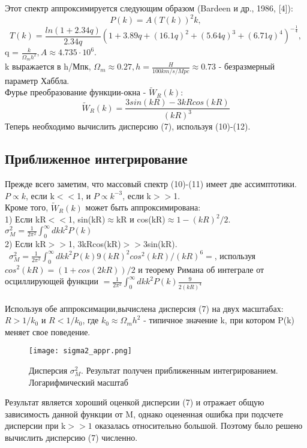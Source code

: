 \documentclass[11pt]{article}
\begin{document}
Этот спектр аппроксимируется следующим образом (Bardeen и др., 1986, [4]): \\
\begin{equation}
P(k) = A(T(k))^2k,
\end{equation}
\begin{equation}
T(k) = \frac{ln(1+2.34q)}{2.34q}(1+3.89q+(16.1q)^2+(5.64q)^3+(6.71q)^4)^{-\frac{1}{4}},
\end{equation}
q = $\frac{k}{\Omega_mh^2}, A\approx4.735\cdot10^6.$ \\
k выражается в h/Мпк, $\Omega_m \approx0.27, h = \frac{H}{100km/s/Mpc}\approx0.73$ - безразмерный параметр Хаббла.\\
Фурье преобразование функции-окна - $ \tilde{W}_R(k)$:
\begin{equation}
\tilde{W}_R(k) = \frac{3sin(kR) - 3kRcos(kR)}{(kR)^3}
\end{equation}
Теперь необходимо вычислить дисперсию (7), используя (10)-(12).  
\subsection{Приближенное интегрирование}
Прежде всего заметим, что массовый спектр (10)-(11) имеет две ассимптотики. $P\propto k$, если k$<<$1, и $P\propto k^{-3}$, если k$>>$1. \\
Кроме того, $\tilde{W}_R(k)$ может быть аппроксимирована:\\ 1) Если kR$<<$1, sin(kR)$\approx$kR и cos(kR)$\approx 1-(kR)^2/2$. \\
$\sigma_{M}^{2} = \frac{1}{2\pi^2} \int_{0}^{\infty} dkk^2P(k)$\\
2) Если kR$>>$1, 3kRcos(kR)$>>$3sin(kR). \\ \  $\sigma_{M}^{2} = \frac{1}{2\pi^2} \int_{0}^{\infty} dkk^2P(k)9(kR)^2cos^2(kR)/(kR)^6 = $, используя $cos^2(kR) = (1+cos(2kR))/2$ и теорему Римана об интеграле от осциллирующей функции $ = \frac{1}{2\pi^2} \int_{0}^{\infty} dkk^2P(k)\frac{9}{2(kR)^4}$\\
\\
Используя обе аппроксимации,вычислена дисперсия (7) на двух масштабах: $R>1/k_0$ и $R<1/k_0$, где $k_0\approx \Omega_m h^2$ - типичное значение k, при котором P(k) меняет свое поведение.\\
\begin{figure}[H]
\centering
\texttt{[image: sigma2\_appr.png]}
\caption{Дисперсия $\sigma_{M}^{2}$. Результат получен приближенным интегрированием. Логарифмический масштаб}  
\end{figure}
Результат является хороший оценкой дисперсии (7) и отражает общую зависимость данной функции от M, однако оцененная ошибка при подсчете дисперсии при k$>>1$ оказалась относительно большой. Поэтому было решено вычислить дисперсию (7) численно. 
\end{document}
